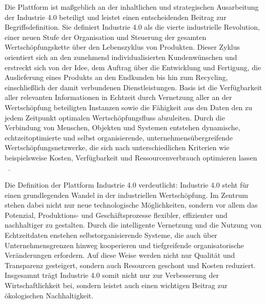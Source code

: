 Die Plattform ist maßgeblich an der inhaltlichen und strategischen Ausarbeitung der Industrie 4.0 beteiligt und leistet einen entscheidenden Beitrag zur Begriffsdefinition. 
Sie definiert Industrie 4.0 als
\glqq die vierte industrielle Revolution, einer neuen Stufe der Organisation und Steuerung der gesamten Wertschöpfungskette über den Lebenszyklus von Produkten.
Dieser Zyklus orientiert sich an den zunehmend individualisierten Kundenwünschen und erstreckt sich von der Idee, dem Auftrag über die Entwicklung und Fertigung, die Auslieferung eines Produkts an den Endkunden bis hin zum Recycling, einschließlich der damit verbundenen Dienstleistungen.
Basis ist die Verfügbarkeit aller relevanten Informationen in Echtzeit durch Vernetzung aller an der Wertschöpfung beteiligten Instanzen sowie die Fähigkeit aus den Daten den zu jedem Zeitpunkt optimalen Wertschöpfungsfluss abzuleiten. 
Durch die Verbindung von Menschen, Objekten und Systemen entstehen dynamische, echtzeitoptimierte und selbst organisierende, unternehmensübergreifende Wertschöpfungsnetzwerke, die sich nach unterschiedlichen Kriterien wie beispielsweise Kosten, Verfügbarkeit und Ressourcenverbrauch optimieren lassen \grqq~\cite[S. 8]{plattform_i40_definition}.

Die Definition der Plattform Industrie 4.0 verdeutlicht: Industrie 4.0 steht für einen grundlegenden Wandel in der industriellen Wertschöpfung.
Im Zentrum stehen dabei nicht nur neue technologische Möglichkeiten, sondern vor allem das Potenzial, Produktions- und Geschäftsprozesse flexibler, effizienter und nachhaltiger zu gestalten.
Durch die intelligente Vernetzung und die Nutzung von Echtzeitdaten enstehen selbstorganisierende Systeme, die auch über Unternehmensgrenzen hinweg kooperieren und tiefgreifende organisatorische Veränderungen erfordern.
Auf diese Weise werden nicht nur Qualität und Transparenz gesteigert, sondern auch Resourcen geschont und Kosten reduziert.
Insgesamnt trägt Industrie 4.0 somit nicht nur zur Verbesserung der Wirtschaftlichkeit bei, sondern leistet auch einen wichtigen Beitrag zur ökologischen Nachhaltigkeit.





